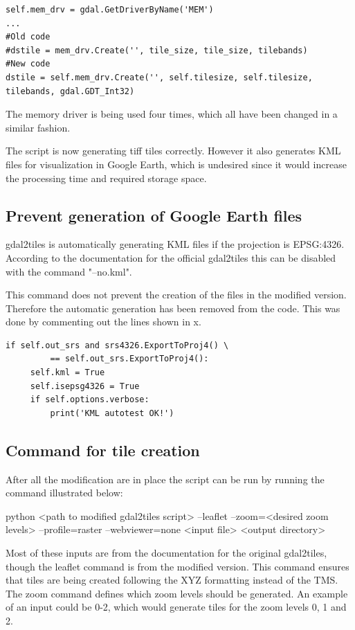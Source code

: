 \begin{lstlisting}[language=iPython, caption={Increasing the bit depth}, label= VoresPY,escapechar=|]
self.mem_drv = gdal.GetDriverByName('MEM')
...
#Old code
#dstile = mem_drv.Create('', tile_size, tile_size, tilebands)
#New code
dstile = self.mem_drv.Create('', self.tilesize, self.tilesize, tilebands, gdal.GDT_Int32)
\end{lstlisting}
The memory driver is being used four times, which all have been changed in a similar fashion.


The script is now generating tiff tiles correctly. However it also generates KML files for visualization in Google Earth, which is undesired since it would increase the processing time and required storage space. 
\subsection{Prevent generation of Google Earth files}
gdal2tiles is automatically generating KML files if the projection is EPSG:4326. According to the documentation for the official gdal2tiles this can be disabled with the command "--no.kml".
\citep{gdal2tilesDoc}


This command does not prevent the creation of the files in the modified version. Therefore the automatic generation has been removed from the code. This was done by commenting out the lines shown in x. 

\begin{lstlisting}[language=iPython, caption={Increasing the bit depth}, label= KML,escapechar=|]
 if self.out_srs and srs4326.ExportToProj4() \
         == self.out_srs.ExportToProj4():
     self.kml = True
     self.isepsg4326 = True
     if self.options.verbose:
         print('KML autotest OK!')
\end{lstlisting}
        
\subsection{Command for tile creation}

After all the modification are in place the script can be run by running the command illustrated below:


python <path to modified gdal2tiles script> --leaflet --zoom=<desired zoom levels> --profile=raster --webviewer=none <input file> <output directory>


Most of these inputs are from the documentation for the original gdal2tiles, though the leaflet command is from the modified version. This command ensures that tiles are being created following the XYZ formatting instead of the TMS. The zoom command defines which zoom levels should be generated. An example of an input could be 0-2, which would generate tiles for the zoom levels 0, 1 and 2. 

